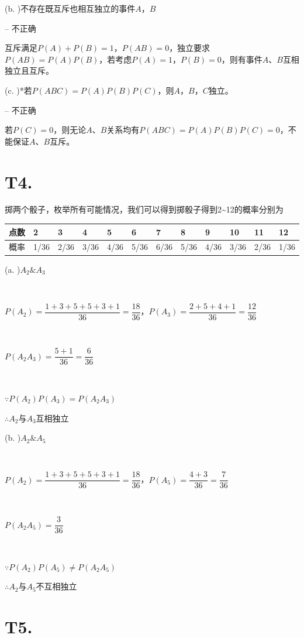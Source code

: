 \documentclass{article}
\begin{document}
(b. )不存在既互斥也相互独立的事件$A$，$B$

-- 不正确

互斥满足$P(A)+P(B)=1$，$P(AB)=0$，独立要求$P(AB)=P(A)P(B)$，若考虑$P(A)=1$，$P(B)=0$，则有事件$A$、$B$互相独立且互斥。

(c. )*若$P(ABC)=P(A)P(B)P(C)$，则$A$，$B$，$C$独立。

-- 不正确

若$P(C)=0$，则无论$A$、$B$关系均有$P(ABC)=P(A)P(B)P(C)=0$，不能保证$A$、$B$互斥。

\section*{T4. }

掷两个骰子，枚举所有可能情况，我们可以得到掷骰子得到2\~{}12的概率分别为

\begin{table}[!ht]
    \centering
    \begin{tabular}{|l|l|l|l|l|l|l|l|l|l|l|l|}
    \hline
        点数 & 2 & 3 & 4 & 5 & 6 & 7 & 8 & 9 & 10 & 11 & 12 \\ \hline
        概率 & 1/36 & 2/36 & 3/36 & 4/36 & 5/36 & 6/36 & 5/36 & 4/36 & 3/36 & 2/36 & 1/36 \\ \hline
    \end{tabular}
\end{table}

(a. )$A_2\&A_3$

~

$P(A_2)=\dfrac{1+3+5+5+3+1}{36}=\dfrac{18}{36}$，$P(A_3)=\dfrac{2+5+4+1}{36}=\dfrac{12}{36}$

~

$P(A_2A_3)=\dfrac{5+1}{36}=\dfrac{6}{36}$

~

$\because P(A_2)P(A_3)=P(A_2A_3)$

$\therefore A_2$与$A_3$互相独立

(b. )$A_2\&A_5$

~

$P(A_2)=\dfrac{1+3+5+5+3+1}{36}=\dfrac{18}{36}$，$P(A_5)=\dfrac{4+3}{36}=\dfrac{7}{36}$

~

$P(A_2A_5)=\dfrac{3}{36}$

~

$\because P(A_2)P(A_5)\neq P(A_2A_5)$

$\therefore A_2$与$A_5$不互相独立

\section*{T5. }
\end{document}
